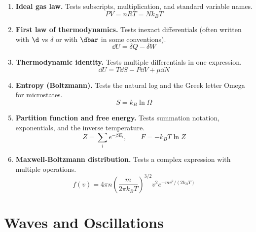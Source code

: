 \documentclass[11pt]{article}
\begin{document}
\begin{enumerate}

\item \textbf{Ideal gas law.}
Tests subscripts, multiplication, and standard variable names.
\[
  PV = nRT = Nk_B T
\]

\item \textbf{First law of thermodynamics.}
Tests inexact differentials (often written with $\d$ vs $\delta$ or with
$\dbar$ in some conventions).
\[
  \dd{U} = \delta Q - \delta W
\]

\item \textbf{Thermodynamic identity.}
Tests multiple differentials in one expression.
\[
  \dd{U} = T\dd{S} - P\dd{V} + \mu\dd{N}
\]

\item \textbf{Entropy (Boltzmann).}
Tests the natural log and the Greek letter Omega for microstates.
\[
  S = k_B \ln \Omega
\]

\item \textbf{Partition function and free energy.}
Tests summation notation, exponentials, and the inverse temperature.
\[
  Z = \sum_i e^{-\beta E_i}, \qquad
  F = -k_B T \ln Z
\]

\item \textbf{Maxwell-Boltzmann distribution.}
Tests a complex expression with multiple operations.
\[
  f(v) = 4\pi n
  \left(\frac{m}{2\pi k_B T}\right)^{3/2}
  v^2 e^{-mv^2/(2k_B T)}
\]

\end{enumerate}

\section{Waves and Oscillations}
\end{document}
